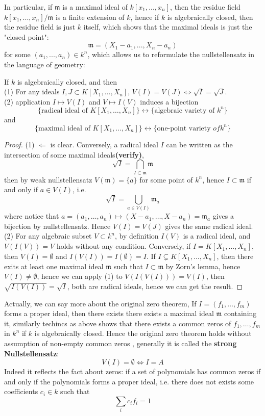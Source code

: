 In particular, if \(\mathfrak{m}\) is a maximal ideal of \(k[x_1,...,x_n]\), then the residue field \(k[x_1,...,x_n]/\mathfrak{m}\) is a finite extension of \(k\), hence if \(k\) is algebraically closed, then the residue field is just \(k\) itself, which shows that the maximal ideals is just the "closed point":     \[\mathfrak{m} = (X_1 - a_1,...,X_n - a_n)\]
for some \((a_1,...,a_n) \in k^n\), which allows us to reformulate the nullstellensatz in the language of geometry:
\begin{corollary}
    If \(k\) is algebraically closed, and then\\
    (1) For any ideals \(I,J \subset K[X_1,\dots,X_n]\), \(V(I) = V(J) \iff \sqrt{I} = \sqrt{J}\).\\
    (2) application \(I \mapsto V(I)\) and \(V \mapsto I(V)\) induces a bijection
    \[\{\text{radical ideal of } K[X_1,\dots,X_n]\} \longleftrightarrow \{\text{algebraic variety of } k^n\}\]
    and
    \[\{\text{maximal ideal of } K[X_1,\dots,X_n]\} \longleftrightarrow \{\text{one-point variety } of k^n\}\]
\end{corollary}
\begin{proof}
    (1) \(\Leftarrow\) is clear. Conversely, a radical ideal \(I\) can be written as the intersection of some maximal ideals\textbf{(verify)},
    \[\sqrt{I} = \bigcap_{I \subset \mathfrak{m} } \mathfrak{m}\]
    then by weak nullstellensatz \(V(\mathfrak{m}) = \{a\}\) for some point of \(k^n\), hence \(I \subset \mathfrak{m}\) if and only if \(a \in V(I)\), i.e.
    \[\sqrt{I} = \bigcup_{a \in V(I)} \mathfrak{m}_a\]
    where notice that \(a=(a_1,\dots,a_n) \mapsto (X-a_1,\dots,X-a_n) = \mathfrak{m}_a\) gives a bijection by nullstellensatz. Hence \(V(I) = V(J)\) gives the same radical ideal.\\

    (2) For any algebraic subset \(V \subset k^n\), by definition \(I(V)\) is a radical ideal, and \(V(I(V)) = V\) holds without any condition. Conversely, if \(I = K[X_1,\dots,X_n]\), then \(V(I) = \emptyset\) and \(I(V(I)) = I(\emptyset) = I\). If \(I \subsetneq K[X_1,\dots,X_n]\), then there exits at least one maximal ideal \(\mathfrak{m}\) such that \(I \subset \mathfrak{m}\) by Zorn's lemma, hence \(V(I) \neq \emptyset\), hence we can apply (1) to \(V(I(V(I))) = V(I)\), then \(\sqrt{I(V(I))} = \sqrt{I}\), both are radical ideals, hence we can get the result.
\end{proof}
\begin{remark}
    Actually, we can say more about the original zero theorem, If \(I = (f_1,\dots,f_m)\) forms a proper ideal, then there exists there exists a maximal ideal \(\mathfrak{m}\) containing it, similarly techincs as above shows that there exists a common zeros of \(f_1,\dots,f_m\) in \(k^n\) if \(k\) is algebraically closed. Hence the original zero theorem holds without assumption of non-empty common zeros , generally it is called the \textbf{strong Nullstellensatz}:
    \[V(I) = \emptyset \iff I = A\]
    Indeed it reflects the fact about zeros: if a set of polynomials has common zeros if and only if the polynomials forms a proper ideal, i.e. there does not exists some coefficients \(c_i \in k\) such that \[\sum_i c_i f_i = 1\]
\end{remark}

